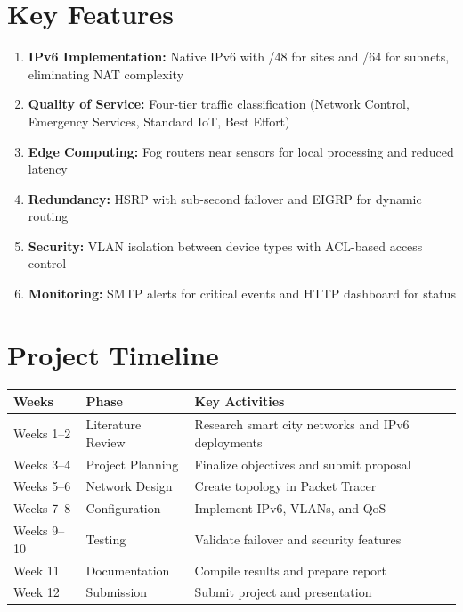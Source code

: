 \documentclass[12pt,a4paper]{article}
\begin{document}
\section*{Key Features}
{}
\begin{enumerate}[label=5.\arabic*, nosep]
    \item \textbf{IPv6 Implementation:} Native IPv6 with /48 for sites and /64 for subnets, eliminating NAT complexity
    \item \textbf{Quality of Service:} Four-tier traffic classification (Network Control, Emergency Services, Standard IoT, Best Effort)
    \item \textbf{Edge Computing:} Fog routers near sensors for local processing and reduced latency
    \item \textbf{Redundancy:} HSRP with sub-second failover and EIGRP for dynamic routing
    \item \textbf{Security:} VLAN isolation between device types with ACL-based access control
    \item \textbf{Monitoring:} SMTP alerts for critical events and HTTP dashboard for status
\end{enumerate}


\section*{Project Timeline}
{}

\vspace{1em}
\renewcommand{\arraystretch}{1.2}
\setlength{\extrarowheight}{4pt}

\begin{center}
\begin{tabularx}{\textwidth}{
    |>{\raggedright\arraybackslash}p{2.4cm}
    |>{\raggedright\arraybackslash}p{4.2cm}
    |>{\raggedright\arraybackslash}X|
}
\hline
\textbf{Weeks} & \textbf{Phase} & \textbf{Key Activities} \\
\hline
Weeks 1--2 & Literature Review & Research smart city networks and IPv6 deployments \\
\hline
Weeks 3--4 & Project Planning & Finalize objectives and submit proposal \\
\hline
Weeks 5--6 & Network Design & Create topology in Packet Tracer \\
\hline
Weeks 7--8 & Configuration & Implement IPv6, VLANs, and QoS \\
\hline
Weeks 9--10 & Testing & Validate failover and security features \\
\hline
Week 11 & Documentation & Compile results and prepare report \\
\hline
Week 12 & Submission & Submit project and presentation \\
\hline
\end{tabularx}
\end{center}
\end{document}
